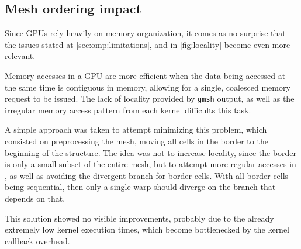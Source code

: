 \subsection{Mesh ordering impact}
\label{subsec:cuda:ordering}

Since GPUs rely heavily on memory organization, it comes as no surprise that the issues stated at \cref{sec:omp:limitations}, and in \cref{fig:locality} become even more relevant.

Memory accesses in a GPU are more efficient when the data being accessed at the same time is contiguous in memory, allowing for a single, coalesced memory request to be issued. The lack of locality provided by \texttt{gmsh} output, as well as the irregular memory access pattern from each kernel difficults this task.

A simple approach was taken to attempt minimizing this problem, which consisted on preprocessing the mesh, moving all cells in the border to the beginning of the structure. The idea was not to increase locality, since the border is only a small subset of the entire mesh, but to attempt more regular accesses in \computeflux, as well as avoiding the divergent branch for border cells. With all border cells being sequential, then only a single warp should diverge on the branch that depends on that.

This solution showed no visible improvements, probably due to the already extremely low kernel execution times, which become bottlenecked by the kernel callback overhead. 

